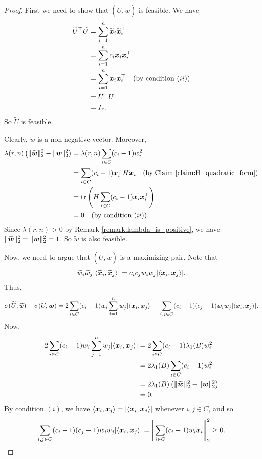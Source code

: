 \documentclass[11pt]{article}
\theoremstyle{plain}
\numberwithin{equation}{section}
\DeclareMathOperator{\tr}{tr}
\def\w{\mbox{\boldmath $w$}}
\def\x{\mbox{\boldmath $x$}}
\newcommand{\ip}[2]{\langle #1, #2 \rangle}
\begin{document}
\begin{proof} First we need to show that $(\widetilde{U}, \widetilde{w})$ is feasible. We have 
\begin{align*}
    \widetilde{U}^\top \widetilde{U} 
    &  = \sum_{i=1}^n \widetilde{\x}_i\widetilde{\x}_i^\top\\
    & = \sum_{i=1}^n c_i\x_i\x_i^\top\\
    & = \sum_{i=1}^n \x_i\x_i^\top \quad(\text{by condition $(ii)$})\\
    & = U^\top U\\
    & = I_r. 
\end{align*}
So $\widetilde{U}$ is feasible. 

Clearly, $\widetilde{w}$ is a non-negative vector. Moreover, 
\begin{align*}
    \lambda(r,n) \left(\|\widetilde{\w}\|_2^2 - \|\w\|_2^2\right)
    & = \lambda(r,n) \sum_{i\in C}(c_i - 1)w_i^2\\
    & = \sum_{i\in C} (c_i-1)\x_i^\top H\x_i\quad (\text{by Claim \ref{claim:H_quadratic_form}})\\
    & = \tr\left(H \sum_{i\in C}(c_i-1)\x_i\x_i^\top \right)\\
    & = 0 \quad (\text{by condition $(ii)$}).
\end{align*}
Since $\lambda(r,n)>0$ by Remark \ref{remark:lambda_is_positive}, we have $\|\widetilde{\w}\|_2^2 = \|\w\|_2^2 = 1$. So $\widetilde{w}$ is also feasible. 

Now, we need to argue that $(\widetilde{U}, \widetilde{w})$ is a maximizing pair. Note that
\[\widetilde{w}_i\widetilde{w}_j|\ip{\widetilde{\x}_i}{\widetilde{\x}_j}| = c_ic_jw_iw_j|\ip{\x_i}{\x_j}|.\]
Thus, 
\begin{equation}\label{eq:difference}
    \sigma(\widetilde{U}, \widetilde{w})-\sigma(U, \w)  
    = 2\sum_{i\in C} (c_i-1)w_i \sum_{j=1}^n w_j|\ip{\x_i}{\x_j}| + \sum_{i,j\in C}(c_i-1)(c_j-1)w_iw_j|\ip{\x_i}{\x_j}|.
\end{equation}
Now, 
\begin{align}\label{eq:linear_term}
  2\sum_{i\in C} (c_i-1)w_i \sum_{j=1}^n w_j|\ip{\x_i}{\x_j}| 
  & = 2\sum_{i\in C} (c_i-1)\lambda_1(B)w_i^2\nonumber\\
  & = 2\lambda_1(B)\sum_{i\in C} (c_i-1)w_i^2\nonumber\\
  & = 2\lambda_1(B)\left(\|\widetilde{\w}\|_2^2 - \|\w\|_2^2\right)\nonumber\\
  & = 0.  
\end{align}
By condition $(i)$, we have $\ip{\x_i}{\x_j} = |\ip{\x_i}{\x_j}|$ whenever $i,j\in C$, and so
\begin{equation}\label{eq:quadratic_term}
       \sum_{i,j\in C}(c_i-1)(c_j-1)w_iw_j|\ip{\x_i}{\x_j}|  = \left\|\sum_{i\in C}(c_i-1)w_i\x_i\right\|_2^2\ge 0.
\end{equation}


\end{proof}
\end{document}
